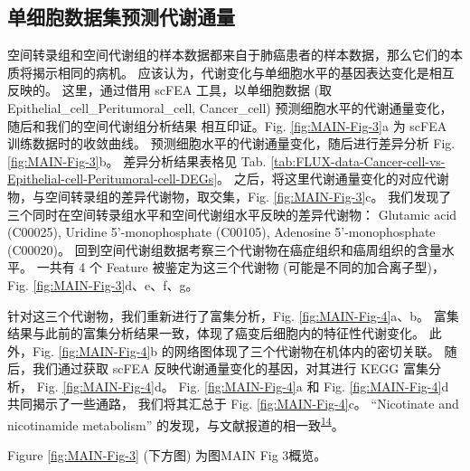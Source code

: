 \documentclass[
]{article}
\begin{document}
\begin{center}\vspace{1.5cm}\end{center}

\hypertarget{ux5355ux7ec6ux80deux6570ux636eux96c6ux9884ux6d4bux4ee3ux8c22ux901aux91cf}{%
\subsection{单细胞数据集预测代谢通量}\label{ux5355ux7ec6ux80deux6570ux636eux96c6ux9884ux6d4bux4ee3ux8c22ux901aux91cf}}

空间转录组和空间代谢组的样本数据都来自于肺癌患者的样本数据，那么它们的本质将揭示相同的病机。
应该认为，代谢变化与单细胞水平的基因表达变化是相互反映的。
这里，通过借用 scFEA 工具，以单细胞数据 (取 Epithelial\_cell\_Peritumoral\_cell, Cancer\_cell)
预测细胞水平的代谢通量变化，随后和我们的空间代谢组分析结果
相互印证。Fig. \ref{fig:MAIN-Fig-3}a 为 scFEA 训练数据时的收敛曲线。
预测细胞水平的代谢通量变化，随后进行差异分析 Fig. \ref{fig:MAIN-Fig-3}b。
差异分析结果表格见 Tab. \ref{tab:FLUX-data-Cancer-cell-vs-Epithelial-cell-Peritumoral-cell-DEGs}。
之后，将这里代谢通量变化的对应代谢物，与空间转录组的差异代谢物，取交集，Fig. \ref{fig:MAIN-Fig-3}c。
我们发现了三个同时在空间转录组水平和空间代谢组水平反映的差异代谢物：
Glutamic acid (C00025), Uridine 5'-monophosphate (C00105), Adenosine 5'-monophosphate (C00020)。
回到空间代谢组数据考察三个代谢物在癌症组织和癌周组织的含量水平。
一共有 4 个 Feature 被鉴定为这三个代谢物 (可能是不同的加合离子型)，
Fig. \ref{fig:MAIN-Fig-3}d、e、f、g。

针对这三个代谢物，我们重新进行了富集分析，Fig. \ref{fig:MAIN-Fig-4}a、b。
富集结果与此前的富集分析结果一致，体现了癌变后细胞内的特征性代谢变化。
此外，Fig. \ref{fig:MAIN-Fig-4}b 的网络图体现了三个代谢物在机体内的密切关联。
随后，我们通过获取 scFEA 反映代谢通量变化的基因，对其进行 KEGG 富集分析，
Fig. \ref{fig:MAIN-Fig-4}d。
Fig. \ref{fig:MAIN-Fig-4}a 和 Fig. \ref{fig:MAIN-Fig-4}d 共同揭示了一些通路，
我们将其汇总于 Fig. \ref{fig:MAIN-Fig-4}c。
``Nicotinate and nicotinamide metabolism'' 的发现，与文献报道的相一致\textsuperscript{\protect\hyperlink{ref-IntegratedMetaFahrma2017}{14}}。

\begin{center}\vspace{1.5cm}\end{center}

Figure \ref{fig:MAIN-Fig-3} (下方图) 为图MAIN Fig 3概览。
\end{document}
